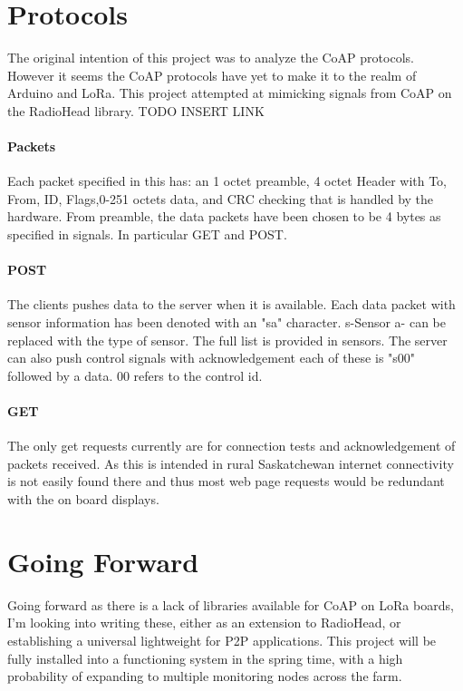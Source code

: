 \documentclass[]{report}
\begin{document}
\section{Protocols}

The original intention of this project was to analyze the CoAP protocols. However it seems the CoAP protocols have yet to make it to the realm of Arduino and LoRa. This project attempted at mimicking signals from CoAP on the RadioHead library. TODO INSERT LINK
\paragraph{Packets}
Each packet specified in this has: an 1 octet preamble, 4 octet Header with To, From, ID, Flags,0-251 octets data, and CRC checking that is handled by the hardware. From preamble, the data packets have been chosen to be 4 bytes as specified in signals. In particular GET and POST. 

\paragraph{POST}
The clients pushes data to the server when it is available. Each data packet with sensor information has been denoted with an "sa" character. s-Sensor a- can be replaced with the type of sensor. The full list is provided in sensors. The server can also push control signals with acknowledgement each of these is "s00" followed by a data. 00 refers to the control id. 

\paragraph{GET}
The only get requests currently are for connection tests and acknowledgement of packets received. As this is intended in rural Saskatchewan internet connectivity is not easily found there and thus most web page requests would be redundant with the on board displays.

\section{Going Forward}
Going forward as there is a lack of libraries available for CoAP on LoRa boards, I'm looking into writing these, either as an extension to RadioHead, or establishing a universal lightweight for P2P applications. This project will be fully installed into a functioning system in the spring time, with a high probability of expanding to multiple monitoring nodes across the farm.
\end{document}
